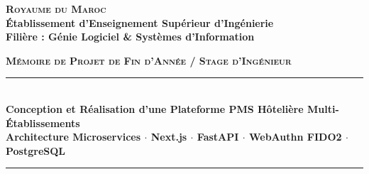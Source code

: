 
\begin{titlepage}
\begin{center}

{\Large \textbf{\textsc{Royaume du Maroc}}}\\[0.2cm]
{\large \textbf{Établissement d'Enseignement Supérieur d'Ingénierie}}\\[0.2cm]
{\small \textbf{Filière : Génie Logiciel \& Systèmes d'Information}}\\[1.2cm]


\vspace{1.2cm}

{\Large \textbf{\textsc{Mémoire de Projet de Fin d'Année / Stage d'Ingénieur}}}\\[0.4cm]
\rule{\textwidth}{1.5pt}\\[0.4cm]
{\huge \textbf{\textcolor{primaryBlue}{Conception et Réalisation d'une Plateforme PMS Hôtelière Multi-Établissements}}}\\[0.3cm]
{\large \textbf{\textcolor{secondaryGold}{Architecture Microservices $\cdot$ Next.js $\cdot$ FastAPI $\cdot$ WebAuthn FIDO2 $\cdot$ PostgreSQL}}}\\[0.2cm]
\rule{\textwidth}{1.5pt}\\[1.2cm]


\end{center}
\end{titlepage}
